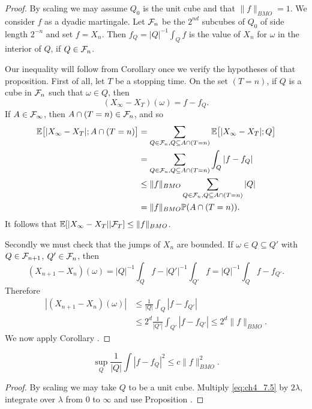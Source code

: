 \begin{proof}
By scaling we may assume $Q_0$ is the unit cube and that $\|f\|_{BMO} = 1$. We consider $f$ as a dyadic martingale. Let $\mathcal{F}_n$ be the $2^{nd}$ subcubes of $Q_0$ of side length $2^{-n}$ and set $f = X_n$. Then $f_Q = |Q|^{-1}\int_Q f$ is the value of $X_n$ for $\omega$ in the interior of $Q$, if $Q \in \mathcal{F}_n$.

Our inequality will follow from Corollary  once we verify the hypotheses of that proposition. First of all, let $T$ be a stopping time. On the set $(T = n)$, if $Q$ is a cube in $\mathcal{F}_n$ such that $\omega \in Q$, then
\[
    (X_\infty - X_T)(\omega) = f - f_Q.
\]
If $A \in \mathcal{F}_\infty$, then $A \cap (T = n) \in \mathcal{F}_n$, and so
\begin{align*}
    \mathbb{E}\big[|X_\infty - X_T|; A \cap (T = n)\big] &= \sum_{Q\in\mathcal{F}_n,Q\subseteq A\cap(T=n)} \mathbb{E}\big[|X_\infty - X_T|; Q\big] \\
    &= \sum_{Q\in\mathcal{F}_n,Q\subseteq A\cap(T=n)} \int_Q |f - f_Q| \\
    &\leq \|f\|_{BMO} \sum_{Q\in\mathcal{F}_n,Q\subseteq A\cap(T=n)} |Q| \\
    &= \|f\|_{BMO}\mathbb{P}(A \cap (T = n)).
\end{align*}
It follows that $\mathbb{E}[|X_\infty - X_T|| \mathcal{F}_T] \leq \|f\|_{BMO}$.

Secondly we must check that the jumps of $X_n$ are bounded. If $\omega \in Q \subseteq Q'$ with $Q \in \mathcal{F}_{n+1}$, $Q' \in \mathcal{F}_n$, then
\mpagebreak
\[
    (X_{n+1} - X_n)(\omega) = |Q|^{-1}\int_Q f - |Q'|^{-1}\int_{Q'} f = |Q|^{-1}\int_Q f - f_{Q'}.
\]
Therefore
\begin{align*}
    |(X_{n+1} - X_n)(\omega)| &\leq \frac{1}{|Q|}\int_Q |f - f_{Q'}| \\
    &\leq 2^d\frac{1}{|Q'|}\int_{Q'} |f - f_{Q'}| \leq 2^d\|f\|_{BMO}.
\end{align*}
We now apply Corollary .
\end{proof}


\begin{corollary}\label{cor:ch4_7.7}
\[
    \sup_Q \frac{1}{|Q|}\int |f - f_Q|^2 \leq c\|f\|^2_{BMO}.
\]
\end{corollary}

\begin{proof}
By scaling we may take $Q$ to be a unit cube. Multiply \eqref{eq:ch4_7.5} by $2\lambda$, integrate over $\lambda$ from $0$ to $\infty$ and use Proposition .
\end{proof}

